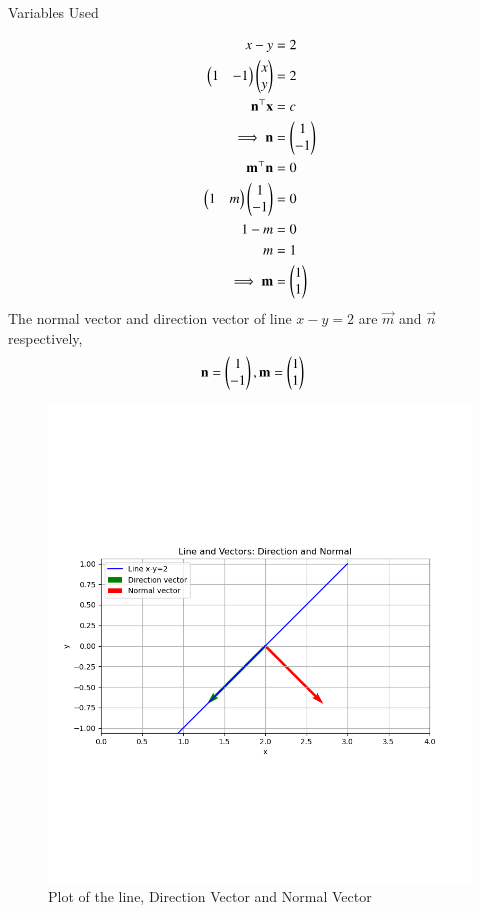 \documentclass[journal]{IEEEtran}
\begin{document}
\solution
\begin{table}[h!]    
  \centering
  
  \caption{Variables Used}
  \label{tab4.2.10.1}
\end{table}
\begin{align}
    x-y&=2 \\
    \begin{pmatrix}1 & -1\end{pmatrix}\begin{pmatrix}x \\ y\end{pmatrix}&=2 \\
    \mathbf{n}^\top\mathbf{x}&=c \\
    \implies\mathbf{n}&=\begin{pmatrix}1 \\ -1\end{pmatrix} \\
    \mathbf{m}^\top\mathbf{n}&=0 \\
    \begin{pmatrix}1 & m\end{pmatrix}\begin{pmatrix}1 \\ -1\end{pmatrix}&=0 \\
    1-m&=0 \\
    m&=1 \\
    \implies \mathbf{m}&=\begin{pmatrix}1 \\ 1\end{pmatrix}
\end{align}
The normal vector and direction vector of line $x-y=2$ are $\vec{m}$ and $\vec{n}$ respectively,
\begin{align}
    \mathbf{n}&=\begin{pmatrix}1 \\ -1\end{pmatrix}, \mathbf{m}=\begin{pmatrix}1 \\ 1\end{pmatrix}
\end{align}
\begin{figure}[ht!]
	\centering
   	\includegraphics[width=0.8\linewidth]{figs/fig.png}
   	\caption{Plot of the line, Direction Vector and Normal Vector}
\label{Plot}
\end{figure}
\end{document}
